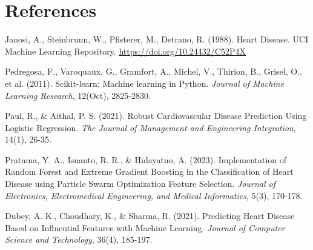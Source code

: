 \documentclass{article}
\begin{document}
\section*{References}
\begin{thebibliography}{99}

    Janosi, A., Steinbrunn, W., Pfisterer, M., Detrano, R. (1988). Heart Disease. UCI Machine Learning Repository. \url{https://doi.org/10.24432/C52P4X}

    Pedregosa, F., Varoquaux, G., Gramfort, A., Michel, V., Thirion, B., Grisel, O., et al. (2011). Scikit-learn: Machine learning in Python. \textit{Journal of Machine Learning Research}, 12(Oct), 2825-2830.

    Paul, R., \& Aithal, P. S. (2021). Robust Cardiovascular Disease Prediction Using Logistic Regression. \textit{The Journal of Management and Engineering Integration}, 14(1), 26-35.

    Pratama, Y. A., Isnanto, R. R., \& Hidayatno, A. (2023). Implementation of Random Forest and Extreme Gradient Boosting in the Classification of Heart Disease using Particle Swarm Optimization Feature Selection. \textit{Journal of Electronics, Electromedical Engineering, and Medical Informatics}, 5(3), 170-178.

    Dubey, A. K., Choudhary, K., \& Sharma, R. (2021). Predicting Heart Disease Based on Influential Features with Machine Learning. \textit{Journal of Computer Science and Technology}, 36(4), 185-197.

\end{thebibliography}
\end{document}
